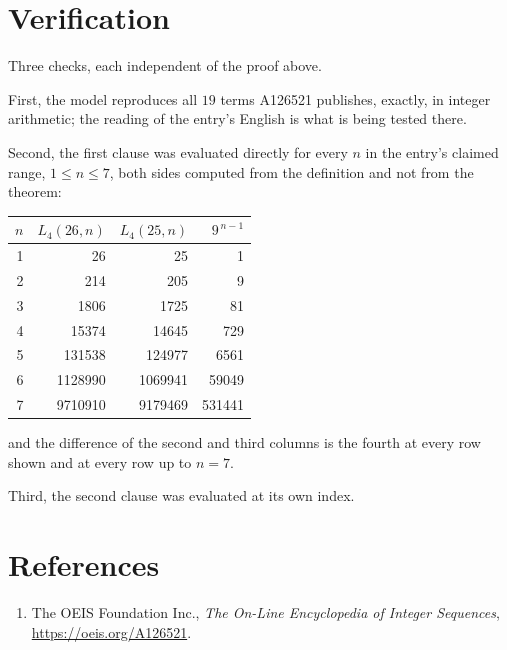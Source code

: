 \documentclass[11pt,a4paper]{article}
\theoremstyle{plain}
\theoremstyle{definition}
\begin{document}
\section{Verification}

Three checks, each independent of the proof above.

First, the model reproduces all $19$ terms A126521 publishes, exactly, in integer
arithmetic; the reading of the entry's English is what is being tested there.

Second, the first clause was evaluated directly for every $n$ in the entry's claimed range,
$1\le n\le7$, both sides computed from the definition and not from the theorem:

\begin{center}
\begin{tabular}{rrrr}
$n$ & $L_{4}(26,n)$ & $L_{4}(25,n)$ & $9^{\,n-1}$ \\ \hline
1 & 26 & 25 & 1 \\
2 & 214 & 205 & 9 \\
3 & 1806 & 1725 & 81 \\
4 & 15374 & 14645 & 729 \\
5 & 131538 & 124977 & 6561 \\
6 & 1128990 & 1069941 & 59049 \\
7 & 9710910 & 9179469 & 531441 \\
\end{tabular}
\end{center}

\noindent and the difference of the second and third columns is the fourth at every row shown
and at every row up to $n=7$.

Third, the second clause was evaluated at its own index.

\section*{References}
\begin{enumerate}
\item The OEIS Foundation Inc., \emph{The On-Line Encyclopedia of Integer Sequences},
\url{https://oeis.org/A126521}.
\end{enumerate}
\end{document}
